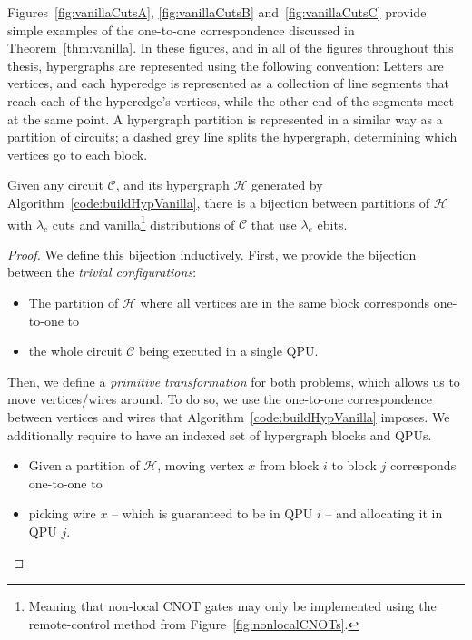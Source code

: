 Figures~\ref{fig:vanillaCutsA}, \ref{fig:vanillaCutsB} and~\ref{fig:vanillaCutsC} provide simple examples of the one-to-one correspondence discussed in Theorem~\ref{thm:vanilla}. In these figures, and in all of the figures throughout this thesis, hypergraphs are represented using the following convention: Letters are vertices, and each hyperedge is represented as a collection of line segments that reach each of the hyperedge's vertices, while the other end of the segments meet at the same point. A hypergraph partition is represented in a similar way as a partition of circuits; a dashed grey line splits the hypergraph, determining which vertices go to each block.



\begin{theorem} Given any circuit \(\mathcal{C}\), and its hypergraph \(\mathcal{H}\) generated by Algorithm~\ref{code:buildHypVanilla}, there is a bijection between partitions of \(\mathcal{H}\) with \(\lambda_c\) cuts and vanilla\footnote{Meaning that non-local CNOT gates may only be implemented using the remote-control method from Figure~\ref{fig:nonlocalCNOTs}.} distributions of \(\mathcal{C}\) that use \(\lambda_e\) ebits.
\label{thm:vanilla}
\end{theorem} \begin{proof}
We define this bijection inductively. First, we provide the bijection between the \textit{trivial configurations}:
\begin{itemize}
  \item The partition of \(\mathcal{H}\) where all vertices are in the same block corresponds one-to-one to 
  \item the whole circuit \(\mathcal{C}\) being executed in a single QPU.
\end{itemize}

Then, we define a \textit{primitive transformation} for both problems, which allows us to move vertices/wires around. To do so, we use the one-to-one correspondence between vertices and wires that Algorithm~\ref{code:buildHypVanilla} imposes. We additionally require to have an indexed set of hypergraph blocks and QPUs.
\begin{itemize}
  \item Given a partition of \(\mathcal{H}\), moving vertex \(x\) from block \(i\) to block \(j\) corresponds one-to-one to
  \item picking wire \(x\) -- which is guaranteed to be in QPU \(i\) -- and allocating it in QPU \(j\).
\end{itemize}


\end{proof}
